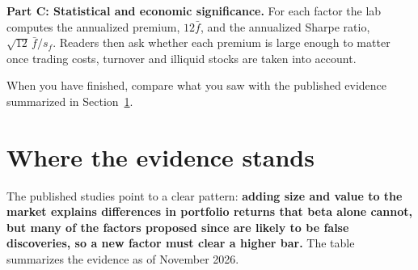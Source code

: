 \textbf{Part C: Statistical and economic significance.} For each factor the lab computes the annualized premium, $12\bar{f}$, and the annualized Sharpe ratio, $\sqrt{12}\,\bar{f}/s_f$. Readers then ask whether each premium is large enough to matter once trading costs, turnover and illiquid stocks are taken into account.

When you have finished, compare what you saw with the published evidence summarized in Section~\ref{sec:04-verdict}.

\section{Where the evidence stands}
\label{sec:04-verdict}

The published studies point to a clear pattern: \textbf{adding size and value to the market explains differences in portfolio returns that beta alone cannot, but many of the factors proposed since are likely to be false discoveries, so a new factor must clear a higher bar.} The table summarizes the evidence as of November 2026.


